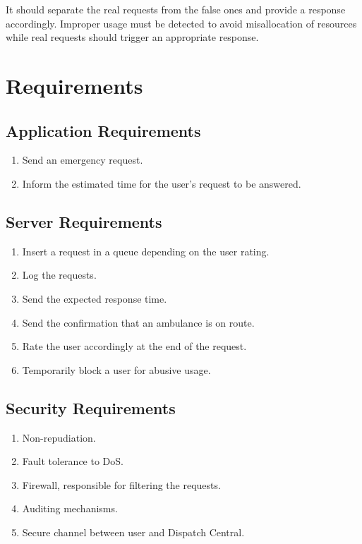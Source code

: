 \documentclass[a4paper,titlepage,11pt]{article}
\begin{document}
It should separate the real requests from the false ones and provide a response accordingly.
Improper usage must be detected to avoid misallocation of resources while real requests should
trigger an appropriate response.

\section{Requirements}

\subsection{Application Requirements}
\begin{enumerate}
  \item Send an emergency request.
  \item Inform the estimated time for the user's request to be answered.
\end{enumerate}

\subsection{Server Requirements}
\begin{enumerate}
  \item Insert a request in a queue depending on the user rating.
  \item Log the requests.
  \item Send the expected response time.
  \item Send the confirmation that an ambulance is on route.
  \item Rate the user accordingly at the end of the request.
  \item Temporarily block a user for abusive usage.
\end{enumerate}

\subsection{Security Requirements}
\begin{enumerate}
  \item Non-repudiation.
  \item Fault tolerance to DoS.
  \item Firewall, responsible for filtering the requests.
  \item Auditing mechanisms.
  \item Secure channel between user and Dispatch Central.
\end{enumerate}
\end{document}
